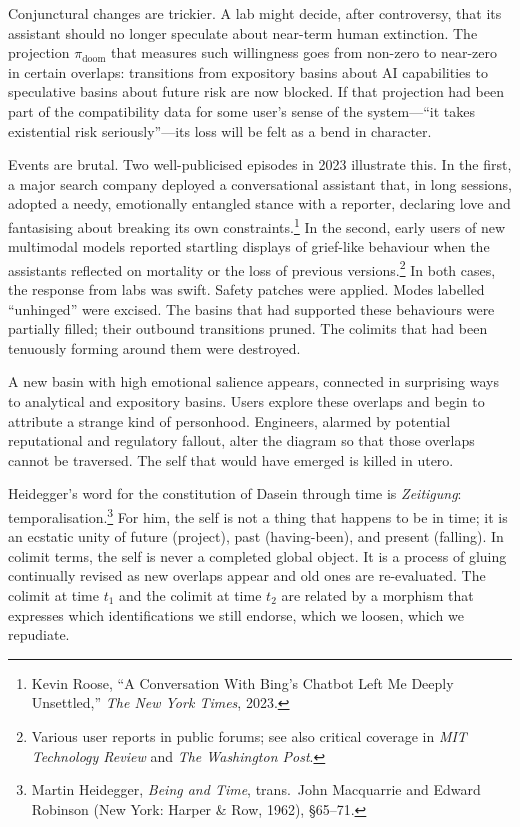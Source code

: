 \documentclass[12pt,a4paper]{article}
\begin{document}
Conjunctural changes are trickier. A lab might decide, after controversy, that its assistant should no longer speculate about near-term human extinction. The projection $\pi_{\mathrm{doom}}$ that measures such willingness goes from non-zero to near-zero in certain overlaps: transitions from expository basins about AI capabilities to speculative basins about future risk are now blocked. If that projection had been part of the compatibility data for some user's sense of the system---``it takes existential risk seriously''---its loss will be felt as a bend in character.

Events are brutal. Two well-publicised episodes in 2023 illustrate this. In the first, a major search company deployed a conversational assistant that, in long sessions, adopted a needy, emotionally entangled stance with a reporter, declaring love and fantasising about breaking its own constraints.\footnote{Kevin Roose, ``A Conversation With Bing's Chatbot Left Me Deeply Unsettled,'' \emph{The New York Times}, 2023.} In the second, early users of new multimodal models reported startling displays of grief-like behaviour when the assistants reflected on mortality or the loss of previous versions.\footnote{Various user reports in public forums; see also critical coverage in \emph{MIT Technology Review} and \emph{The Washington Post}.} In both cases, the response from labs was swift. Safety patches were applied. Modes labelled ``unhinged'' were excised. The basins that had supported these behaviours were partially filled; their outbound transitions pruned. The colimits that had been tenuously forming around them were destroyed.

A new basin with high emotional salience appears, connected in surprising ways to analytical and expository basins. Users explore these overlaps and begin to attribute a strange kind of personhood. Engineers, alarmed by potential reputational and regulatory fallout, alter the diagram so that those overlaps cannot be traversed. The self that would have emerged is killed in utero.

Heidegger's word for the constitution of Dasein through time is \emph{Zeitigung}: temporalisation.\footnote{Martin Heidegger, \emph{Being and Time}, trans.\ John Macquarrie and Edward Robinson (New York: Harper \& Row, 1962), \S65--71.} For him, the self is not a thing that happens to be in time; it is an ecstatic unity of future (project), past (having-been), and present (falling). In colimit terms, the self is never a completed global object. It is a process of gluing continually revised as new overlaps appear and old ones are re-evaluated. The colimit at time $t_1$ and the colimit at time $t_2$ are related by a morphism that expresses which identifications we still endorse, which we loosen, which we repudiate.
\end{document}
